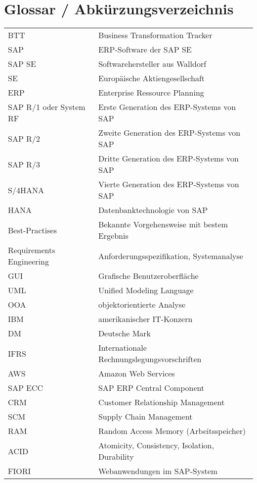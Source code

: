 \newpage

\tableofcontents

\newpage

\section*{Glossar / Abkürzungsverzeichnis}
\begin{xltabular}{\textwidth}{p{0.4\textwidth}p{0.6\textwidth}}
    BTT & Business Transformation Tracker\\
    SAP & ERP-Software der SAP SE\\
    SAP SE & Softwarehersteller aus Walldorf\\
    SE & Europäische Aktiengesellschaft\\
    ERP & Enterprise Ressource Planning\\
    SAP R/1 oder System RF & Erste Generation des ERP-Systems von SAP\\
    SAP R/2 & Zweite Generation des ERP-Systems von SAP\\
    SAP R/3 & Dritte Generation des ERP-Systems von SAP\\
    S/4HANA & Vierte Generation des ERP-Systems von SAP\\
    HANA & Datenbanktechnologie von SAP\\
    Best-Practises & Bekannte Vorgehensweise mit bestem Ergebnis\\
    Requirements Engineering & Anforderungsspezifikation, Systemanalyse\\
    GUI & Grafische Benutzeroberfläche\\
    UML & Unified Modeling Language\\
    OOA & objektorientierte Analyse\\
    IBM & amerikanischer IT-Konzern\\
    DM & Deutsche Mark\\
    IFRS & Internationale Rechnungslegungsvorschriften\\
    AWS & Amazon Web Services\\
    SAP ECC & SAP ERP Central Component\\
    CRM & Customer Relationship Management\\
    SCM & Supply Chain Management\\
    RAM & Random Access Memory (Arbeitsspeicher)\\
    ACID & Atomicity, Consistency, Isolation, Durability \\
    FIORI & Webanwendungen im SAP-System\\

\end{xltabular}
